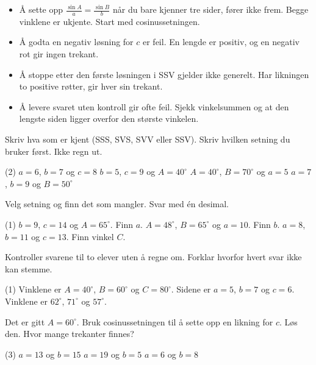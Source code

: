 \begin{vanligfeil}
\begin{itemize}[leftmargin=1.2em,itemsep=1pt,topsep=0pt]
  \item Å sette opp $\frac{\sin A}{a} = \frac{\sin B}{b}$ når du bare kjenner tre sider, fører ikke frem. Begge vinklene er ukjente. Start med cosinussetningen.
  \item Å godta en negativ løsning for $c$ er feil. En lengde er positiv, og en negativ rot gir ingen trekant.
  \item Å stoppe etter den første løsningen i SSV gjelder ikke generelt. Har likningen to positive røtter, gir hver sin trekant.
  \item Å levere svaret uten kontroll gir ofte feil. Sjekk vinkelsummen og at den lengste siden ligger overfor den største vinkelen.
\end{itemize}
\end{vanligfeil}


Skriv hva som er kjent (SSS, SVS, SVV eller SSV). Skriv hvilken setning du bruker først. Ikke regn ut.
\begin{tasks}(2)
  \task $a = 6$, $b = 7$ og $c = 8$
  \task $b = 5$, $c = 9$ og $A = 40^\circ$
  \task $A = 40^\circ$, $B = 70^\circ$ og $a = 5$
  \task $a = 7$, $b = 9$ og $B = 50^\circ$
\end{tasks}

Velg setning og finn det som mangler. Svar med én desimal.
\begin{tasks}(1)
  \task $b = 9$, $c = 14$ og $A = 65^\circ$. Finn $a$.
  \task $A = 48^\circ$, $B = 65^\circ$ og $a = 10$. Finn $b$.
  \task $a = 8$, $b = 11$ og $c = 13$. Finn vinkel $C$.
\end{tasks}

Kontroller svarene til to elever uten å regne om. Forklar hvorfor hvert svar ikke kan stemme.
\begin{tasks}(1)
  \task Vinklene er $A = 40^\circ$, $B = 60^\circ$ og $C = 80^\circ$. Sidene er $a = 5$, $b = 7$ og $c = 6$.
  \task Vinklene er $62^\circ$, $71^\circ$ og $57^\circ$.
\end{tasks}


Det er gitt $A = 60^\circ$. Bruk cosinussetningen til å sette opp en likning for $c$. Løs den. Hvor mange trekanter finnes?
\begin{tasks}(3)
  \task $a = 13$ og $b = 15$
  \task $a = 19$ og $b = 5$
  \task $a = 6$ og $b = 8$
\end{tasks}


